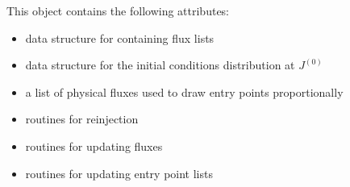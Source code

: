 \documentclass[letterpaper,10pt,english]{sphinxmanual}
\begin{document}
This object contains the following attributes:
\begin{itemize}
\item {} 
data structure for containing flux lists

\item {} 
data structure for the initial conditions distribution at \(J^{(0)}\)

\item {} 
a list of physical fluxes used to draw entry points proportionally

\item {} 
routines for reinjection

\item {} 
routines for updating fluxes

\item {} 
routines for updating entry point lists

\end{itemize}
\end{document}
